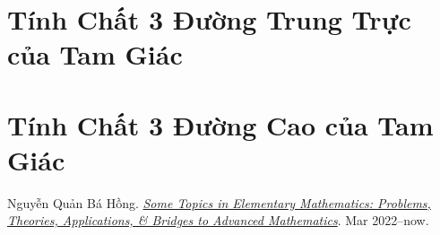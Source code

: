 \documentclass[oneside]{book}
\numberwithin{equation}{section}
\begin{document}
\section{Tính Chất 3 Đường Trung Trực của Tam Giác}

\section{Tính Chất 3 Đường Cao của Tam Giác}


\begin{thebibliography}{99}
	 Nguyễn Quản Bá Hồng. \href{https://github.com/NQBH/hobby/blob/master/elementary_math/NQBH_elementary_math.pdf}{\textit{Some Topics in Elementary Mathematics: Problems, Theories, Applications, \& Bridges to Advanced Mathematics}}. Mar 2022--now.
\end{thebibliography}


\printbibliography[heading=bibintoc]
	
\end{document}
